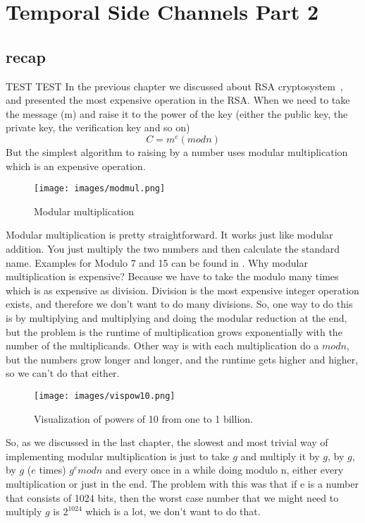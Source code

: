 \chapter{Temporal Side Channels Part 2} \label{cha:Temporal Side Channels Part 2}

\section*{recap}\label{sec:recap}

TEST TEST In the previous chapter we discussed about RSA cryptosystem~\cite{wikiRSA}, and
presented  the most expensive operation in the RSA. When we need to take the
message (m) and raise it to the power of the key (either the public key, the
private key, the verification key and so on)
\[ C = m^e(modn) \] But the simplest algorithm to raising by a number uses
modular multiplication which is an expensive operation.

\begin{figure}[!ht]
    \centering
    \texttt{[image: images/modmul.png]}
    \caption{Modular multiplication} \label{fig:modmul}
\end{figure}

Modular multiplication is pretty straightforward. It works just like modular
addition. You just multiply the two numbers and then calculate the standard
name. Examples for Modulo 7 and 15 can be found in . Why
modular multiplication is expensive? Because we have to take the modulo many
times which is as expensive as division. Division is the most expensive integer
operation exists, and  therefore we don't want to do many divisions. So, one way
to do this is by multiplying and multiplying and doing the modular reduction at
the end, but the problem is the runtime of multiplication grows exponentially
with the number of the multiplicands. Other way is with each multiplication do a
\( mod n \), but the numbers grow longer and longer, and the runtime gets higher
and higher, so we can't do that either. 

\begin{figure}[!ht]
    \centering
    \texttt{[image: images/vispow10.png]}
    \caption{Visualization of powers of 10 from one to 1 billion.} \label{vispow10:fig}
\end{figure}

So, as we discussed in the last chapter, the slowest and most trivial way of
implementing modular multiplication is just to take $g$ and multiply it by $g$,
by $g$, by $g$ ($e$ times) \(g^e mod n\) and every once in a while doing modulo
n, either every multiplication or just in the end. The problem with this was
that if e is a number that consists of 1024 bits, then the worst case number
that we might need to multiply $g$ is \( 2^{1024} \) which is a lot, we don't
want to do that.

